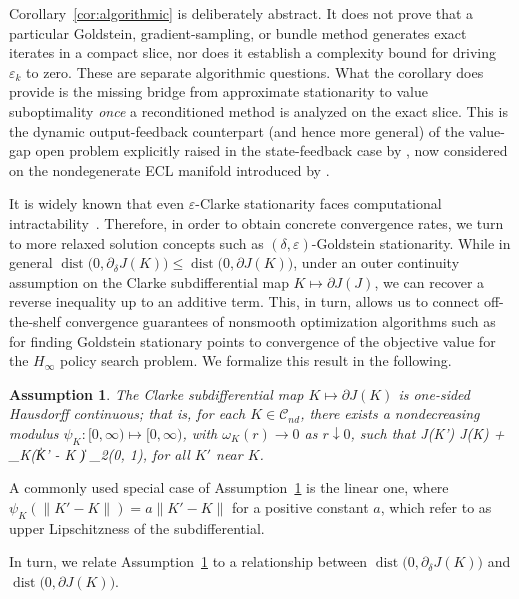 \documentclass[letterpaper,10pt,conference]{ieeeconf}
\def\[#1\]{\begin{align*}#1\end{align*}}
\providecommand{\distop}{\operatorname{dist}}
\renewcommand{\^}[1]{^{(#1)}}
\newtheorem{assumption}[theorem]{Assumption}
\begin{document}
Corollary~\ref{cor:algorithmic} is deliberately abstract. It does not prove that a particular Goldstein, gradient-sampling, or bundle method generates exact iterates in a compact slice, nor does it establish a complexity bound for driving $\varepsilon_k$ to zero. These are separate algorithmic questions. What the corollary does provide is the missing bridge from approximate stationarity to value suboptimality \emph{once} a reconditioned method is analyzed on the exact slice. This is the dynamic output-feedback counterpart (and hence more general) of the value-gap open problem explicitly raised in the state-feedback case by \citet{guo2022global}, now considered on the nondegenerate ECL manifold introduced by \citet{tang2023global}.

It is widely known that even $\varepsilon$-Clarke stationarity faces computational intractability~\citep{zhang2020complexity,guo2022global}. Therefore, in order to obtain concrete convergence rates, we turn to more relaxed solution concepts such as $(\delta, \varepsilon)$-Goldstein stationarity. While in general $\distop\!\bigl(0,\partial_\delta J(K) \bigr) \leq \distop\!\bigl(0,\partial J(K) \bigr)$, under an outer continuity assumption on the Clarke subdifferential map $K \mapsto \partial J(J)$, we can recover a reverse inequality up to an additive term. This, in turn, allows us to connect off-the-shelf convergence guarantees of nonsmooth optimization algorithms such as \citet{zhang2020complexity,davis2022gradient} for finding Goldstein stationary points to convergence of the objective value for the $H_\infty$ policy search problem. We formalize this result in the following.

\begin{assumption} \label{def:Hausdorff}
    The Clarke subdifferential map $K \mapsto \partial J(K)$ is one-sided Hausdorff continuous; that is, for each $K \in \mathcal{C}_{nd}$, there exists a nondecreasing modulus $\psi_K : [0, \infty) \mapsto [0, \infty)$, with $\omega_K(r) \rightarrow 0$ as $r \downarrow 0$, such that
    \[
    \partial J(K') \subset \partial J(K) + \psi_K(\| K' - K \|) _2(0, 1),
    \]
    for all $K'$ near $K$.
\end{assumption}

A commonly used special case of Assumption~\ref{def:Hausdorff} is the linear one, where $\psi_K(\| K' - K \|) = a \| K' - K \|$ for a positive constant $a$, which \citet{kong2025lipschitz} refer to as upper Lipschitzness of the subdifferential.

In turn, we relate Assumption~\ref{def:Hausdorff} to a relationship between $\distop\!\bigl(0,\partial_\delta J(K) \bigr)$ and $\distop\!\bigl(0,\partial J(K) \bigr)$.
\end{document}
